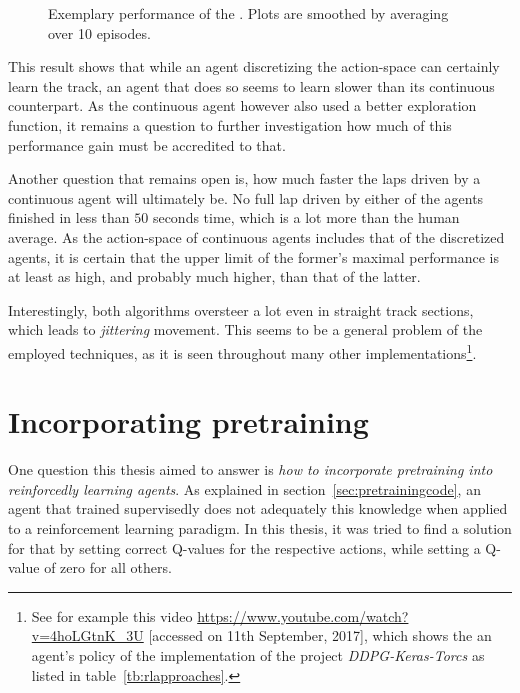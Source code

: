 \begin{figure}[h!]
	{%
		\setlength{\fboxsep}{0pt}%
		\setlength{\fboxrule}{1pt}%
	}%
	\centering
	\caption[Exemplary performance of the ]{Exemplary performance of the . Plots are smoothed by averaging over 10 episodes.}
	\label{fig:ddpg_result}
\end{figure}


This result shows that while an agent discretizing the action-space can certainly learn the track, an agent that does so seems to learn slower than its continuous counterpart. As the continuous agent however also used a better exploration function, it remains a question to further investigation how much of this performance gain must be accredited to that. 

Another question that remains open is, how much faster the laps driven by a continuous agent will ultimately be. No full lap driven by either of the agents finished in less than $50$ seconds time, which is a lot more than the human average. As the action-space of continuous agents includes that of the discretized agents, it is certain that the upper limit of the former's maximal performance is at least as high, and probably much higher, than that of the latter.

Interestingly, both algorithms oversteer a lot even in straight track sections, which leads to \textit{jittering} movement. This seems to be a general problem of the employed techniques, as it is seen throughout many other implementations\footnote{See for example this video \url{https://www.youtube.com/watch?v=4hoLGtnK_3U} [accessed on 11th September, 2017], which shows the an agent's policy of the implementation of the project \textit{DDPG-Keras-Torcs} as listed in table~\ref{tb:rlapproaches}.}.


\section{Incorporating pretraining}
\label{sec:incorporatePre}

One question this thesis aimed to answer is \textit{how to incorporate pretraining into reinforcedly learning agents}. As explained in section~\ref{sec:pretrainingcode}, an agent that trained supervisedly does not adequately  this knowledge when applied to a reinforcement learning paradigm. In this thesis, it was tried to find a solution for that by setting correct Q-values for the respective actions, while setting a Q-value of zero for all others.

